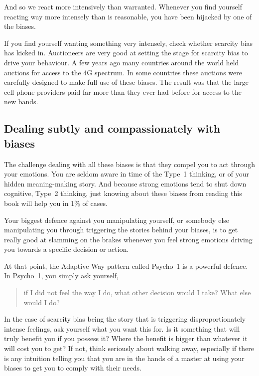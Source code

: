 And so we react more intensively than warranted. Whenever you find yourself reacting way more intensely than is reasonable, you have been hijacked by one of the biases.


If you find yourself wanting something very intensely, check whether scarcity bias has kicked in. Auctioneers are very good at setting the stage for scarcity bias to drive your behaviour. A few years ago many countries around the world held auctions for access to the 4G spectrum. In some countries these auctions were carefully designed to make full use of these biases. The result was that the large cell phone providers paid far more than they ever had before for access to the new bands.


\subsection{Dealing subtly and compassionately with biases}
The challenge dealing with all these biases is that they compel you to act through your emotions. You are seldom aware in time of the Type~1 thinking, or of your hidden meaning\hyp{}making story. And because strong emotions tend to shut down cognitive, Type~2 thinking, just knowing about these biases from reading this book will help you in 1\% of cases.


Your biggest defence against you manipulating yourself, or somebody else manipulating you through triggering the stories behind your biases, is to get really good at slamming on the brakes whenever you feel strong emotions driving you towards a specific decision or action.


At that point, the Adaptive Way  pattern called Psycho~1 is a powerful defence. In Psycho~1, you simply ask yourself, 


\begin{quote}
if I did not feel the way I do, what other decision would I take? What else would I do?
\end{quote} 


In the case of scarcity bias being the story that is triggering disproportionately intense feelings, ask yourself what you want this for. Is it something that will truly benefit you if you possess it? Where the benefit is bigger than whatever it will cost you to get? If not, think seriously about walking away, especially if there is any intuition telling you that you are in the hands of a master at using your biases to get you to comply with their needs.


